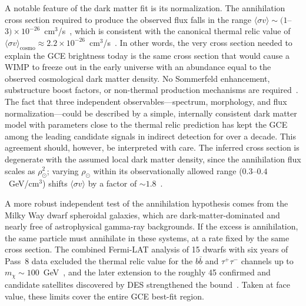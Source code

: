 A notable feature of the dark matter fit is its normalization.
The annihilation cross section required to produce the observed flux falls in the range $\langle \sigma v \rangle \sim (1$--$3) \times 10^{-26}$~cm$^3$/s~\cite{Daylan:2014rsa,Calore:2014xka}, which is consistent with the canonical thermal relic value of $\langle \sigma v \rangle_{\mathrm{cosmo}} \approx 2.2 \times 10^{-26}$~cm$^3$/s~\cite{Cirelli:2024ssz}.
In other words, the very cross section needed to explain the GCE brightness today is the same cross section that would cause a WIMP to freeze out in the early universe with an abundance equal to the observed cosmological dark matter density.
No Sommerfeld enhancement, substructure boost factors, or non-thermal production mechanisms are required~\cite{Daylan:2014rsa}.
The fact that three independent observables---spectrum, morphology, and flux normalization---could be described by a simple, internally consistent dark matter model with parameters close to the thermal relic prediction has kept the GCE among the leading candidate signals in indirect detection for over a decade.
This agreement should, however, be interpreted with care.
The inferred cross section is degenerate with the assumed local dark matter density, since the annihilation flux scales as $\rho_\odot^2$; varying $\rho_\odot$ within its observationally allowed range ($0.3$--$0.4$~GeV/cm$^3$) shifts $\langle \sigma v \rangle$ by a factor of $\sim 1.8$~\cite{Abazajian:2014fta,Daylan:2014rsa}.

A more robust independent test of the annihilation hypothesis comes from the Milky Way dwarf spheroidal galaxies, which are dark-matter-dominated and nearly free of astrophysical gamma-ray backgrounds.
If the excess is annihilation, the same particle must annihilate in these systems, at a rate fixed by the same cross section.
The combined Fermi-LAT analysis of 15 dwarfs with six years of Pass~8 data excluded the thermal relic value for the $b\bar{b}$ and $\tau^+\tau^-$ channels up to $m_\chi \sim 100$~GeV~\cite{Fermi-LAT:2015att}, and the later extension to the roughly 45 confirmed and candidate satellites discovered by DES strengthened the bound~\cite{Fermi-LAT:2016uux}.
Taken at face value, these limits cover the entire GCE best-fit region.

